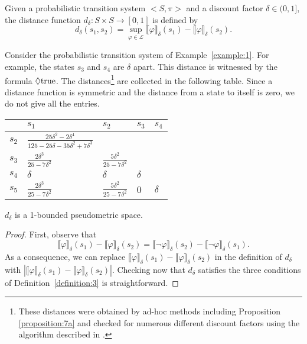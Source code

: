 \documentclass{LMCS}
\newcommand{\interpretation}[1]{\llbracket #1 \rrbracket_{\delta}}
\newcommand{\modality}{\lozenge}
\begin{document}
\begin{defi}
Given a probabilistic transition system $<S, \pi>$ and 
a discount factor $\delta \in (0, 1]$,
the distance function $d_{\delta} : S \times S \to [0, 1]$ is defined by
\begin{displaymath}
d_{\delta}(s_{1}, s_{2})
=
\sup_{\varphi \in \mathcal{L}}
\interpretation{\varphi}(s_{1}) - \interpretation{\varphi}(s_{2}).
\end{displaymath}
\end{defi}

\begin{exa}
Consider the probabilistic transition system of Example~\ref{example:1}.
For example, the states $s_3$ and $s_4$ are $\delta$ apart.  This
distance is witnessed by the formula $\modality \mbox{\rm true}$.
The distances\footnote{These distances were obtained by ad-hoc methods including
  Proposition \ref{proposition:7a} and checked for numerous different
  discount factors using the algorithm described in \cite{BW06:tcs}.}
are collected in the following table.  Since a distance function is
symmetric and the distance from a state to itself is zero, we do not
give all the entries.
\begin{center}
\begin{tabular}{l|p{8em}p{8em}p{8em}p{8em}}
      & $s_1$    & $s_2$    & $s_3$    & $s_4$\\
\hline
$s_2$ & $\frac{25 \delta^2 - 2 \delta^4}{125 - 25 \delta - 35 \delta^2 + 7 \delta^3}$ \\
$s_3$ & $\frac{2 \delta^3}{25 - 7 \delta^2}$ & $\frac{5 \delta^2}{25 - 7 \delta^2}$ & \\
$s_4$ & $\delta$ & $\delta$ & $\delta$ & \\
$s_5$ & $\frac{2 \delta^3}{25 - 7 \delta^2}$ & $\frac{5 \delta^2}{25 - 7 \delta^2}$ & 0        & $\delta$
\end{tabular}
\end{center}
\end{exa}

\begin{prop}
\label{proposition:1}
$d_{\delta}$ is a 1-bounded pseudometric space.
\end{prop}
\begin{proof}
First, observe that
\begin{displaymath}
\interpretation{\varphi}(s_1) - \interpretation{\varphi}(s_2)
=
\interpretation{\neg \varphi}(s_2) - \interpretation{\neg \varphi}(s_1).
\end{displaymath}
As a consequence, we can replace 
$\interpretation{\varphi}(s_1) - \interpretation{\varphi}(s_2)$ in
the definition of $d_{\delta}$ with
$| \interpretation{\varphi}(s_1) - \interpretation{\varphi}(s_2) |$.
Checking now that $d_{\delta}$ satisfies the three conditions of
Definition~\ref{definition:3} is straightforward.
\end{proof}
\end{document}
